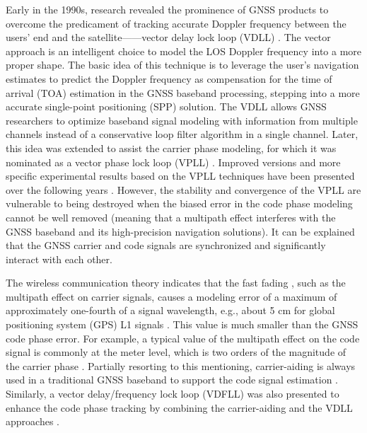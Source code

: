 \documentclass{article}
\begin{document}
Early in the 1990s, research revealed the prominence of GNSS products to overcome the predicament of tracking accurate Doppler frequency between the users' end and the satellite------vector delay lock loop (VDLL) \cite{Parkinson1996}. The vector approach is an intelligent choice to model the LOS Doppler frequency into a more proper shape. The basic idea of this technique is to leverage the user's navigation estimates to predict the Doppler frequency as compensation for the time of arrival (TOA) estimation in the GNSS baseband processing, stepping into a more accurate single-point positioning (SPP) solution. The VDLL allows GNSS researchers to optimize baseband signal modeling with information from multiple channels instead of a conservative loop filter algorithm in a single channel. Later, this idea was extended to assist the carrier phase modeling, for which it was nominated as a vector phase lock loop (VPLL) \cite{Zhodzishsky1998}. Improved versions and more specific experimental results based on the VPLL techniques have been presented over the following years \cite{Henkel2009,Shafaati2018a}. However, the stability and convergence of the VPLL are vulnerable to being destroyed when the biased error in the code phase modeling cannot be well removed (meaning that a multipath effect interferes with the GNSS baseband and its high-precision navigation solutions). It can be explained that the GNSS carrier and code signals are synchronized and significantly interact with each other. 

The wireless communication theory indicates that the fast fading \cite{Satyanarayana2012}, such as the multipath effect on carrier signals, causes a modeling error of a maximum of approximately one-fourth of a signal wavelength, e.g., about 5 cm for global positioning system (GPS) L1 signals \cite{Kelly2001}. This value is much smaller than the GNSS code phase error. For example, a typical value of the multipath effect on the code signal is commonly at the meter level, which is two orders of the magnitude of the carrier phase \cite{VANNEE1992}. Partially resorting to this mentioning, carrier-aiding is always used in a traditional GNSS baseband to support the code signal estimation \cite{Kaplan2017}. Similarly, a vector delay/frequency lock loop (VDFLL) was also presented to enhance the code phase tracking by combining the carrier-aiding and the VDLL approaches \cite{Lashley2009a}. 
\end{document}
